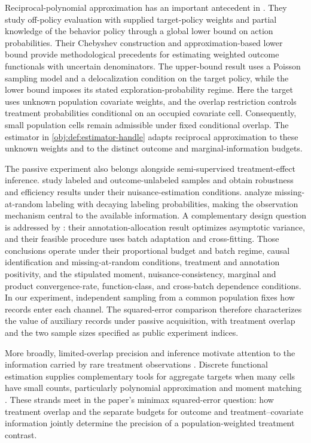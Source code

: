 Reciprocal-polynomial approximation has an important antecedent in \citet[Section 3.3, Theorems 5--6]{MaZhuJiaoWainwright2022OPE}. They study off-policy evaluation with supplied target-policy weights and partial knowledge of the behavior policy through a global lower bound on action probabilities. Their Chebyshev construction and approximation-based lower bound provide methodological precedents for estimating weighted outcome functionals with uncertain denominators. The upper-bound result uses a Poisson sampling model and a delocalization condition on the target policy, while the lower bound imposes its stated exploration-probability regime. Here the target uses unknown population covariate weights, and the overlap restriction controls treatment probabilities conditional on an occupied covariate cell. Consequently, small population cells remain admissible under fixed conditional overlap. The estimator in \cref{obj:def:estimator-handle} adapts reciprocal approximation to these unknown weights and to the distinct outcome and marginal-information budgets.

The passive experiment also belongs alongside semi-supervised treatment-effect inference. \citet[Theorem 2.1 and Corollary 2.1]{ChakraborttyDai2024Semisupervised} study labeled and outcome-unlabeled samples and obtain robustness and efficiency results under their nuisance-estimation conditions. \citet[Theorems 3.7, 3.13, and 5.1]{ZhangChakraborttyBradic2023DecayingOverlap} analyze missing-at-random labeling with decaying labeling probabilities, making the observation mechanism central to the available information. A complementary design question is addressed by \citet[Theorems 4.2 and 5.1 of the arXiv manuscript]{NwankwoGoldkindZhou2026Annotations}: their annotation-allocation result optimizes asymptotic variance, and their feasible procedure uses batch adaptation and cross-fitting. Those conclusions operate under their proportional budget and batch regime, causal identification and missing-at-random conditions, treatment and annotation positivity, and the stipulated moment, nuisance-consistency, marginal and product convergence-rate, function-class, and cross-batch dependence conditions. In our experiment, independent sampling from a common population fixes how records enter each channel. The squared-error comparison therefore characterizes the value of auxiliary records under passive acquisition, with treatment overlap and the two sample sizes specified as public experiment indices.

More broadly, limited-overlap precision and inference motivate attention to the information carried by rare treatment observations \citep{Rothe2017LimitedOverlap,ArmstrongKolesar2021ATEInference,MaWang2020RobustIPW}. Discrete functional estimation supplies complementary tools for aggregate targets when many cells have small counts, particularly polynomial approximation and moment matching \citep{JiaoVenkatHanWeissman2015Functionals,WuYang2016Entropy}. These strands meet in the paper's minimax squared-error question: how treatment overlap and the separate budgets for outcome and treatment--covariate information jointly determine the precision of a population-weighted treatment contrast.
